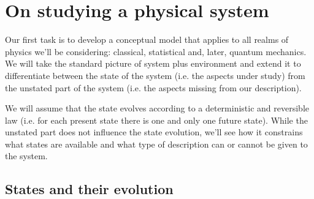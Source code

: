 \documentclass[aps,pra,10pt,twocolumn,floatfix,nofootinbib]{revtex4-1}
\numberwithin{equation}{section}
\theoremstyle{definition}
\begin{document}
\section{On studying a physical system}
\label{sec:fundamental_model}


Our first task is to develop a conceptual model that applies to all realms of physics we'll be considering: classical, statistical and, later, quantum mechanics. We will take the standard picture of system plus environment and extend it to differentiate between the state of the system (i.e. the aspects under study) from the unstated part of the system (i.e. the aspects missing from our description).

We will assume that the state evolves according to a deterministic and reversible law (i.e. for each present state there is one and only one future state). While the unstated part does not influence the state evolution, we'll see how it constrains what states are available and what type of description can or cannot be given to the system.

\subsection{States and their evolution}
\end{document}

